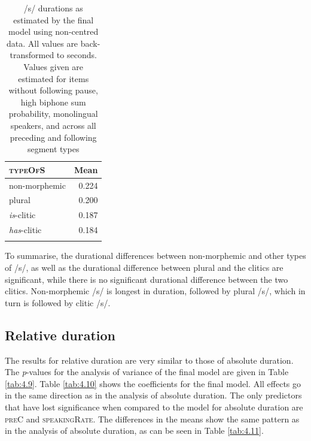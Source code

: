 \begin{table}\fontsize{10}{11}
\caption{/s/ durations as estimated by the final model using non-centred data. All values are back-transformed to seconds. Values given are estimated for items without following pause, high biphone sum probability, monolingual speakers, and across all preceding and following segment types}
\label{tab:4.8}
\begin{tabular}{lr} 
\lsptoprule
\textsc{typeOfS}                      & Mean   \\ 
\midrule
non-morphemic                & 0.224  \\
plural                       & 0.200  \\
\textit{is}-clitic           & 0.187  \\
\textit{has}-clitic          & 0.184  \\
\lspbottomrule
\end{tabular}
\end{table}

To summarise, the durational differences between non-morphemic and other types of /s/, as well as the durational difference between plural and the clitics are significant, while there is no significant durational difference between the two clitics. Non-morphemic /s/ is longest in duration, followed by plural /s/, which in turn is followed by clitic /s/.

\subsection{Relative duration}\label{section04_3_2}

The results for relative duration are very similar to those of absolute duration. The \textit{p}-values for the analysis of variance of the final model are given in Table \ref{tab:4.9}. Table \ref{tab:4.10} shows the coefficients for the final model. All effects go in the same direction as in the analysis of absolute duration. The only predictors that have lost significance when compared to the model for absolute duration are \textsc{preC} and \textsc{speakingRate}. The differences in the means show the same pattern as in the analysis of absolute duration, as can be seen in Table \ref{tab:4.11}.

